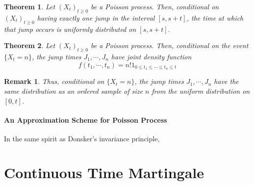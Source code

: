\documentclass{article}
\newtheorem{Thm}{Theorem}[section]
\newtheorem*{Rk}{Remark}
\theoremstyle{definition}
\renewcommand{\leq}{\leqslant}
\renewcommand{\geq}{\geqslant}
\newcommand{\<}{\left\langle}
\renewcommand{\>}{\right\rangle}
\begin{document}
\begin{Thm}
    Let $(X_t)_{t\geq 0}$ be a Poisson process. Then, conditional on $(X_t)_{t\geq 0}$ having exactly one jump in the interval $[s, s +t]$, the time at which that jump occurs is uniformly distributed on $[s, s + t]$.
\end{Thm}
\begin{Thm}
    Let $(X_t)_{t\geq 0}$ be a Poisson process. Then, conditional on the event $\{X_t = n\}$, the jump times $J_1, \cdots ,J_n$ have joint density function
\[f(t_1,\cdots ,t_n)=n!1_{0\leq t_1\leq \cdots \leq t_n\leq t}\]
\end{Thm}
\begin{Rk}
    Thus, conditional on $\{X_t = n\}$, the jump times $J_1, \cdots ,J_n$ have the same distribution as an ordered sample of size $n$ from the uniform distribution on $[0,t]$.
\end{Rk}

\paragraph{An Approximation Scheme for Poisson Process} In the same spirit as Donsker's invariance principle,


\section{Continuous Time Martingale}
\end{document}
